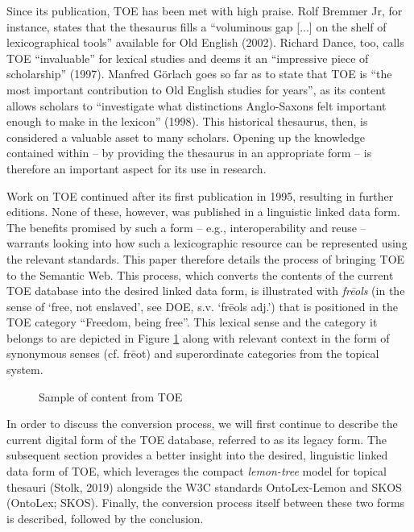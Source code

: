 Since its publication, TOE has been met with high praise. Rolf Bremmer Jr, for instance, states that the thesaurus fills a “voluminous gap [...] on the shelf of lexicographical tools” available for Old English (2002). Richard Dance, too, calls TOE “invaluable” for lexical studies and deems it an “impressive piece of scholarship” (1997). Manfred Görlach goes so far as to state that TOE is “the most important contribution to Old English studies for years”, as its content allows scholars to “investigate what distinctions Anglo-Saxons felt important enough to make in the lexicon” (1998). This historical thesaurus, then, is considered a valuable asset to many scholars. Opening up the knowledge contained within – by providing the thesaurus in an appropriate form – is therefore an important aspect for its use in research.

Work on TOE continued after its first publication in 1995, resulting in further editions. None of these, however, was published in a linguistic linked data form. The benefits promised by such a form – e.g., interoperability and reuse – warrants looking into how such a lexicographic resource can be represented using the relevant standards. This paper therefore details the process of bringing TOE to the Semantic Web. This process, which converts the contents of the current TOE database into the desired linked data form, is illustrated with \textit{frēols} (in the sense of ‘free, not enslaved’, see DOE, s.v. ‘frēols adj.’) that is positioned in the TOE category “Freedom, being free”. This lexical sense and the category it belongs to are depicted in Figure \ref{fig:Stolk2019b:TOE-sample} along with relevant context in the form of synonymous senses (cf. frēot) and superordinate categories from the topical system.

 
\begin{figure}[htbp]
	\framebox[\textwidth]{
		\scalebox{0.65}[0.65]{
%			
		}
	}
	\caption[]{\label{fig:Stolk2019b:TOE-sample} Sample of content from TOE}
\end{figure}


In order to discuss the conversion process, we will first continue to describe the current digital form of the TOE database, referred to as its legacy form. The subsequent section provides a better insight into the desired, linguistic linked data form of TOE, which leverages the compact \textit{lemon-tree} model for topical thesauri (Stolk, 2019) alongside the W3C standards OntoLex-Lemon and SKOS (OntoLex; SKOS). Finally, the conversion process itself between these two forms is described, followed by the conclusion.

